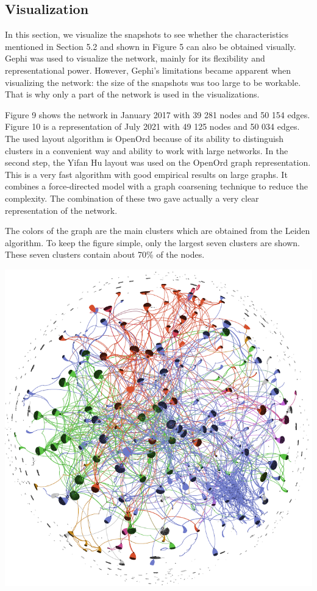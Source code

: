 \documentclass[10pt,a4paper]{article}
\newenvironment{Figure}
  {\par\medskip\noindent\minipage{\linewidth}}
  {\endminipage\par\medskip}
\begin{document}
\begin{multicols}{2}
\section{Visualization} 
In this section, we visualize the snapshots to see whether the characteristics mentioned in Section 5.2 and shown in Figure 5 can also be obtained visually. 
Gephi was used to visualize the network, mainly for its flexibility and representational power. 
However, Gephi's limitations became apparent when visualizing the network: the size of the snapshots was too large to be workable. That is why only a part of the network is used in the visualizations. 

Figure 9 shows the network in January 2017 with 39 281 nodes and 50 154 edges. Figure 10 is a representation of July 2021 with 49 125 nodes and 50 034 edges. The used layout algorithm is OpenOrd \cite{martin2011openord} because of its ability to distinguish clusters in a convenient way and ability to work with large networks. In the second step, the Yifan Hu layout was used on the OpenOrd graph representation. This is a very fast algorithm with good empirical results on large graphs. It combines a force-directed model with a graph coarsening technique to reduce the complexity. The combination of these two gave actually a very clear representation of the network.

The colors of the graph are the main clusters which are obtained from the Leiden algorithm. To keep the figure simple, only the largest seven clusters are shown. These seven clusters contain about 70\% of the nodes. 

\begin{Figure}
\centering
\includegraphics[scale=0.385]{figures/Jan_17_edges.png}
\label{clusters}
\end{Figure}


\end{multicols}
\end{document}
